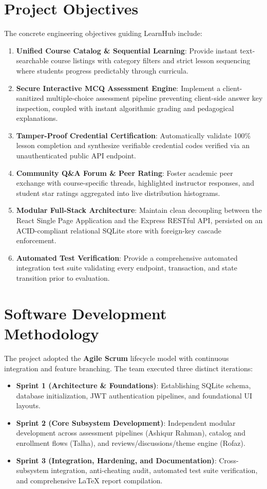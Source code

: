 \documentclass[12pt,a4paper]{report}
\begin{document}
\section{Project Objectives}
The concrete engineering objectives guiding LearnHub include:
\begin{enumerate}[itemsep=3pt]
    \item \textbf{Unified Course Catalog \& Sequential Learning}: Provide instant text-searchable course listings with category filters and strict lesson sequencing where students progress predictably through curricula.
    \item \textbf{Secure Interactive MCQ Assessment Engine}: Implement a client-sanitized multiple-choice assessment pipeline preventing client-side answer key inspection, coupled with instant algorithmic grading and pedagogical explanations.
    \item \textbf{Tamper-Proof Credential Certification}: Automatically validate 100\% lesson completion and synthesize verifiable credential codes verified via an unauthenticated public API endpoint.
    \item \textbf{Community Q\&A Forum \& Peer Rating}: Foster academic peer exchange with course-specific threads, highlighted instructor responses, and student star ratings aggregated into live distribution histograms.
    \item \textbf{Modular Full-Stack Architecture}: Maintain clean decoupling between the React Single Page Application and the Express RESTful API, persisted on an ACID-compliant relational SQLite store with foreign-key cascade enforcement.
    \item \textbf{Automated Test Verification}: Provide a comprehensive automated integration test suite validating every endpoint, transaction, and state transition prior to evaluation.
\end{enumerate}

\section{Software Development Methodology}
The project adopted the \textbf{Agile Scrum} lifecycle model with continuous integration and feature branching. The team executed three distinct iterations:
\begin{itemize}[itemsep=3pt]
    \item \textbf{Sprint 1 (Architecture \& Foundations)}: Establishing SQLite schema, database initialization, JWT authentication pipelines, and foundational UI layouts.
    \item \textbf{Sprint 2 (Core Subsystem Development)}: Independent modular development across assessment pipelines (Ashiqur Rahman), catalog and enrollment flows (Talha), and reviews/discussions/theme engine (Rofaz).
    \item \textbf{Sprint 3 (Integration, Hardening, and Documentation)}: Cross-subsystem integration, anti-cheating audit, automated test suite verification, and comprehensive LaTeX report compilation.
\end{itemize}
\end{document}
